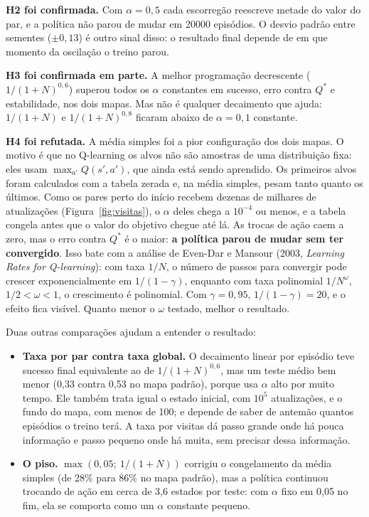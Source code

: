 \documentclass[11pt,a4paper]{article}
\begin{document}
\textbf{H2 foi confirmada.} Com $\alpha = 0{,}5$ cada escorregão reescreve metade do valor do par, e a política não
parou de mudar em 20000 episódios. O desvio padrão entre sementes ($\pm 0{,}13$) é outro sinal disso: o resultado final
depende de em que momento da oscilação o treino parou.

\textbf{H3 foi confirmada em parte.} A melhor programação decrescente ($1/(1+N)^{0,6}$) superou todos os $\alpha$
constantes em sucesso, erro contra $Q^*$ e estabilidade, nos dois mapas. Mas não é qualquer decaimento que ajuda:
$1/(1+N)$ e $1/(1+N)^{0,8}$ ficaram abaixo de $\alpha = 0{,}1$ constante.

\textbf{H4 foi refutada.} A média simples foi a pior configuração dos dois mapas. O motivo é que no Q-learning os alvos
não são amostras de uma distribuição fixa: eles usam $\max_{a'} Q(s',a')$, que ainda está sendo aprendido. Os primeiros
alvos foram calculados com a tabela zerada e, na média simples, pesam tanto quanto os últimos. Como os pares perto do
início recebem dezenas de milhares de atualizações (Figura~\ref{fig:visitas}), o $\alpha$ deles chega a $10^{-4}$ ou
menos, e a tabela congela antes que o valor do objetivo chegue até lá. As trocas de ação caem a zero, mas o erro contra
$Q^*$ é o maior: \textbf{a política parou de mudar sem ter convergido}. Isso bate com a análise de Even-Dar e Mansour
(2003, \emph{Learning Rates for Q-learning}): com taxa $1/N$, o número de passos para convergir pode crescer
exponencialmente em $1/(1-\gamma)$, enquanto com taxa polinomial $1/N^{\omega}$, $1/2 < \omega < 1$, o crescimento é
polinomial. Com $\gamma = 0{,}95$, $1/(1-\gamma) = 20$, e o efeito fica visível. Quanto menor o $\omega$ testado, melhor
o resultado.

Duas outras comparações ajudam a entender o resultado:
\begin{itemize}
  \item \textbf{Taxa por par contra taxa global.} O decaimento linear por episódio teve sucesso final equivalente ao de
    $1/(1+N)^{0,6}$, mas um teste médio bem menor (0,33 contra 0,53 no mapa padrão), porque usa $\alpha$ alto por muito
    tempo. Ele também trata igual o estado inicial, com $10^5$ atualizações, e o fundo do mapa, com menos de 100; e
    depende de saber de antemão quantos episódios o treino terá. A taxa por visitas dá passo grande onde há pouca
    informação e passo pequeno onde há muita, sem precisar dessa informação.
  \item \textbf{O piso.} $\max(0{,}05;\ 1/(1+N))$ corrigiu o congelamento da média simples (de 28\% para 86\% no mapa
    padrão), mas a política continuou trocando de ação em cerca de 3,6 estados por teste: com $\alpha$ fixo em 0,05 no
    fim, ela se comporta como um $\alpha$ constante pequeno.
\end{itemize}
\end{document}
